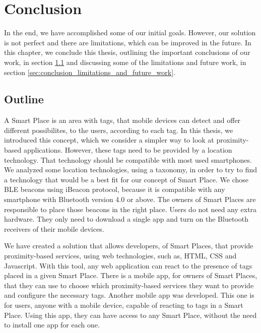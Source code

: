 
\chapter{Conclusion}
\label{chapter:conclusion}
In the end, we have accomplished some of our initial goals.
However, our solution is not perfect and there are limitations, which can be improved in the future.
In this chapter, we conclude this thesis, outlining the important conclusions of our work, in section \ref{sec:conclusion_outline} and discussing some of the limitations and future work, in section \ref{sec:conclusion_limitations_and_future_work}.

\section{Outline}
\label{sec:conclusion_outline}
A Smart Place is an area with tags, that mobile devices can detect and offer different possibilites, to the users, according to each tag.
In this thesis, we introduced this concept, which we consider a simpler way to look at proximity-based applications.
However, these tags need to be provided by a location technology.
That technology should be compatible with most used smartphones.
We analyzed some location technologies, using a taxonomy\cite{location}, in order to try to find a technology that would be a best fit for our concept of Smart Place.
We chose \gls{BLE} beacons using iBeacon protocol, because it is compatible with any smartphone with Bluetooth version 4.0 or above.
The owners of Smart Places are responsible to place those beacons in the right place.
Users do not need any extra hardware.
They only need to download a single app and turn on the Bluetooth receivers of their mobile devices.

We have created a solution that allows developers, of Smart Places, that provide proximity-based services, using web technologies, such as, \gls{HTML}, \gls{CSS} and Javascript.
With this tool, any web application can react to the presence of tags placed in a given Smart Place.
There is a mobile app, for owners of Smart Places, that they can use to choose which proximity-based services they want to provide and configure the necessary tags.
Another mobile app was developed.
This one is for users, anyone with a mobile device, capable of reacting to tags in a Smart Place.
Using this app, they can have access to any Smart Place, without the need to install one app for each one.

